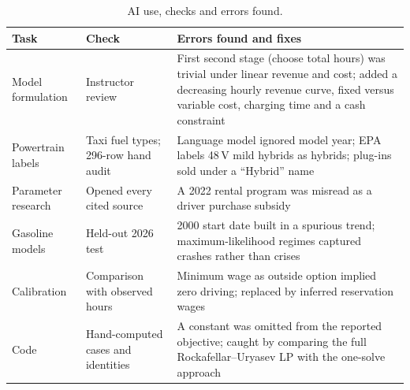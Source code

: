 \documentclass[11pt]{article}
\begin{document}
\begin{table}[H]
\centering
\caption{AI use, checks and errors found.}\label{tab:ai}
\small
\begin{tabularx}{\textwidth}{@{}l X X@{}}
\toprule
Task & Check & Errors found and fixes \\
\midrule
Model formulation & Instructor review & First second stage (choose total hours) was trivial under linear revenue and cost; added a decreasing hourly revenue curve, fixed versus variable cost, charging time and a cash constraint \\
Powertrain labels & Taxi fuel types; 296-row hand audit & Language model ignored model year; EPA labels 48\,V mild hybrids as hybrids; plug-ins sold under a ``Hybrid'' name \\
Parameter research & Opened every cited source & A 2022 rental program was misread as a driver purchase subsidy \\
Gasoline models & Held-out 2026 test & 2000 start date built in a spurious trend; maximum-likelihood regimes captured crashes rather than crises \\
Calibration & Comparison with observed hours & Minimum wage as outside option implied zero driving; replaced by inferred reservation wages \\
Code & Hand-computed cases and identities & A constant was omitted from the reported objective; caught by comparing the full Rockafellar--Uryasev LP with the one-solve approach \\
\bottomrule
\end{tabularx}
\end{table}
\end{document}
